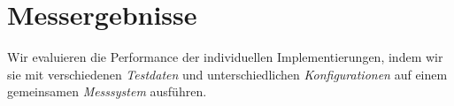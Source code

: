 \chapter{Messergebnisse}
\label{ergebnisse}
Wir  evaluieren die Performance der individuellen Implementierungen, indem wir sie mit verschiedenen \textit{Testdaten} und unterschiedlichen \textit{Konfigurationen} auf einem gemeinsamen \textit{Messsystem} ausführen.







